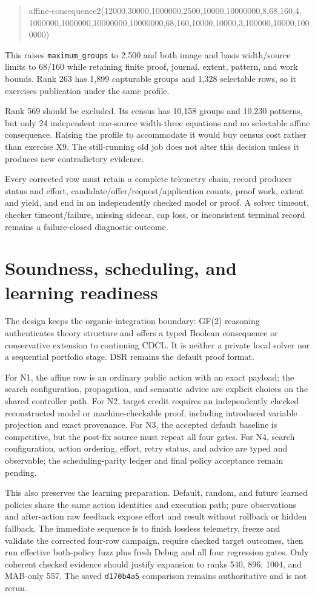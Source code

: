 \documentclass[11pt]{article}
\newcommand{\code}[1]{\texttt{#1}}
\begin{document}
\begin{quote}
\small\ttfamily
affine-consequence2(12000,30000,1000000,2500,10000,10000000,8,68,160,4,
1000000,1000000,10000000,10000000,68,160,10000,10000,3,100000,10000,1000000)
\end{quote}

This raises \code{maximum\_groups} to 2,500 and both image and basis
width/source limits to 68/160 while retaining finite proof, journal, extent,
pattern, and work bounds.  Rank 263 has 1,899 capturable groups and 1,328
selectable rows, so it exercises publication under the same profile.

Rank 569 should be excluded.  Its census has 10,158 groups and 10,230 patterns,
but only 24 independent one-source width-three equations and no selectable
affine consequence.  Raising the profile to accommodate it would buy census
cost rather than exercise X9.  The still-running old job does not alter this
decision unless it produces new contradictory evidence.

Every corrected row must retain a complete telemetry chain, record producer
status and effort, candidate/offer/request/application counts, proof work,
extent and yield, and end in an independently checked model or proof.  A solver
timeout, checker timeout/failure, missing sidecar, cap loss, or inconsistent
terminal record remains a failure-closed diagnostic outcome.

\section*{Soundness, scheduling, and learning readiness}

The design keeps the organic-integration boundary: GF(2) reasoning authenticates
theory structure and offers a typed Boolean consequence or conservative
extension to continuing CDCL.  It is neither a private local solver nor a
sequential portfolio stage.  DSR remains the default proof format.

For N1, the affine row is an ordinary public action with an exact payload; the
search configuration, propagation, and semantic advice are explicit choices
on the shared controller path.  For N2, target credit requires an independently
checked reconstructed model or machine-checkable proof, including introduced
variable projection and exact provenance.  For N3, the accepted default
baseline is competitive, but the post-fix source must repeat all four gates.
For N4, search configuration, action ordering, effort, retry status, and advice
are typed and observable; the scheduling-parity ledger and final policy
acceptance remain pending.

This also preserves the learning preparation.  Default, random, and future
learned policies share the same action identities and execution path; pure
observations and after-action raw feedback expose effort and result without
rollback or hidden fallback.  The immediate sequence is to finish lossless
telemetry, freeze and validate the corrected four-row campaign, require checked
target outcomes, then run effective both-policy fuzz plus fresh Debug and all
four regression gates.  Only coherent checked evidence should justify
expansion to ranks 540, 896, 1004, and MAB-only 557.  The saved
\code{d170b4a5} comparison remains authoritative and is not rerun.
\end{document}
